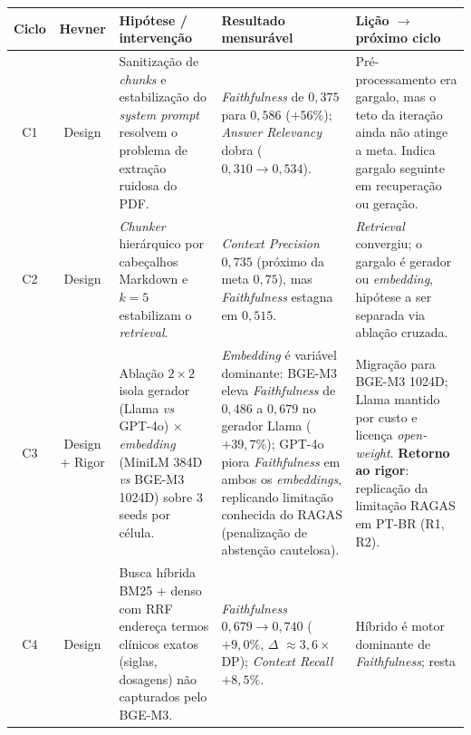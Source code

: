 \documentclass[
  12pt,
  oneside,
  a4paper,
  english,
  brazil
]{abntex2}
\begin{document}
\begin{quadro}[!htbp]
  \centering
  \footnotesize
  \renewcommand{\arraystretch}{1.15}
  \caption{Ciclos DSRM observados no desenvolvimento do artefato,
           classificados frente aos três ciclos de
           \citeauthor{hevner2007} (\citeyear{hevner2007})}
  \label{quad:ciclos-dsrm}
  \begin{tabularx}{\textwidth}{|c|c|X|X|X|}
  \hline
  \rowcolor{gray!25}
  \textbf{Ciclo} & \textbf{Hevner} & \textbf{Hipótese / intervenção} &
  \textbf{Resultado mensurável} & \textbf{Lição $\to$ próximo ciclo} \\ \hline
  C1 & Design & Sanitização de \textit{chunks} e estabilização do
       \textit{system prompt} resolvem o problema de extração ruidosa
       do PDF. &
       \textit{Faithfulness} de $0{,}375$ para $0{,}586$ ($+56\%$);
       \textit{Answer Relevancy} dobra ($0{,}310 \to 0{,}534$). &
       Pré-processamento era gargalo, mas o teto da iteração ainda não
       atinge a meta. Indica gargalo seguinte em recuperação ou
       geração. \\ \hline
  C2 & Design & \textit{Chunker} hierárquico por cabeçalhos Markdown e
       $k=5$ estabilizam o \textit{retrieval}. &
       \textit{Context Precision} $0{,}735$ (próximo da meta $0{,}75$),
       mas \textit{Faithfulness} estagna em $0{,}515$. &
       \textit{Retrieval} convergiu; o gargalo é gerador ou
       \textit{embedding}, hipótese a ser separada via ablação cruzada. \\ \hline
  C3 & Design $+$ Rigor & Ablação $2 \times 2$ isola gerador
       (Llama \emph{vs} GPT-4o) $\times$ \textit{embedding}
       (MiniLM 384D \emph{vs} BGE-M3 1024D) sobre 3 seeds por célula. &
       \textit{Embedding} é variável dominante: BGE-M3 eleva
       \textit{Faithfulness} de $0{,}486$ a $0{,}679$ no gerador Llama
       ($+39{,}7\%$); GPT-4o piora \textit{Faithfulness} em ambos os
       \textit{embeddings}, replicando limitação conhecida do RAGAS
       (penalização de abstenção cautelosa). &
       Migração para BGE-M3 1024D; Llama mantido por custo e licença
       \emph{open-weight}. \textbf{Retorno ao rigor}: replicação da
       limitação RAGAS em PT-BR (R1, R2). \\ \hline
  C4 & Design & Busca híbrida BM25 $+$ denso com RRF endereça termos
       clínicos exatos (siglas, dosagens) não capturados pelo BGE-M3. &
       \textit{Faithfulness} $0{,}679 \to 0{,}740$ ($+9{,}0\%$, $\Delta$
       $\approx 3{,}6\times$ DP); \textit{Context Recall} $+8{,}5\%$. &
       Híbrido é motor dominante de \textit{Faithfulness}; resta

\end{tabularx}
\end{quadro}
\end{document}
